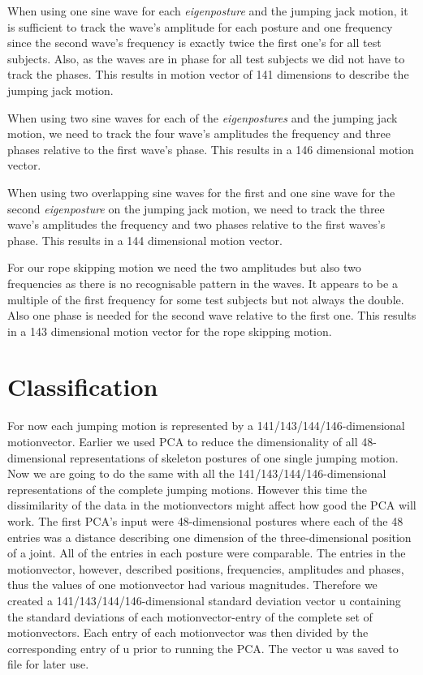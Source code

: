 \documentclass[a4paper]{article}
\begin{document}
When using one sine wave for each \emph{eigenposture} and the jumping jack motion, it is sufficient to track the wave's amplitude for each posture and one frequency since the second wave's frequency is exactly twice the first one's for all test subjects.
Also, as the waves are in phase for all test subjects we did not have to track the phases.
This results in motion vector of 141 dimensions to describe the jumping jack motion.

When using two sine waves for each of the \emph{eigenpostures} and the jumping jack motion, we need to track the four wave's amplitudes the frequency and three phases relative to the first wave's phase.
This results in a 146 dimensional motion vector.

When using two overlapping sine waves for the first and one sine wave for the second \emph{eigenposture} on the jumping jack motion, we need to track the three wave's amplitudes the frequency and two phases relative to the first waves's phase.
This results in a 144 dimensional motion vector.

For our rope skipping motion we need the two amplitudes but also two frequencies as there is no recognisable pattern in the waves.
It appears to be a multiple of the first frequency for some test subjects but not always the double.
Also one phase is needed for the second wave relative to the first one.
This results in a 143 dimensional motion vector for the rope skipping motion.



\section{Classification}

For now each jumping motion is represented by a 141/143/144/146-dimensional motionvector.
Earlier we used PCA to reduce the dimensionality of all 48-dimensional representations of skeleton postures of one single jumping motion.
Now we are going to do the same with all the 141/143/144/146-dimensional representations of the complete jumping motions.
However this time the dissimilarity of the data in the motionvectors might affect how good the PCA will work.
The first PCA's input were 48-dimensional postures where each of the 48 entries was a distance describing one dimension of the three-dimensional position of a joint.
All of the entries in each posture were comparable.
The entries in the motionvector, however, described positions, frequencies, amplitudes and phases, thus the values of one motionvector had various magnitudes.
Therefore we created a 141/143/144/146-dimensional standard deviation vector u containing the standard deviations of each motionvector-entry of the complete set of motionvectors.
Each entry of each motionvector was then divided by the corresponding entry of u prior to running the PCA.
The vector u was saved to file for later use.
\end{document}
